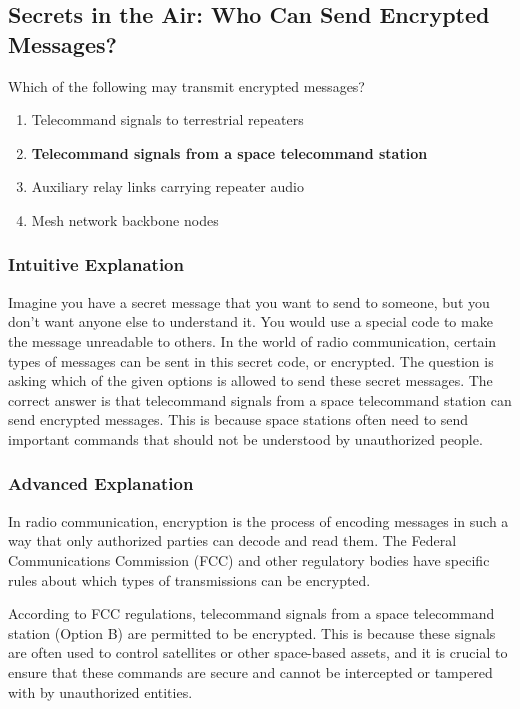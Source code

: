 \subsection{Secrets in the Air: Who Can Send Encrypted Messages?}

\begin{tcolorbox}[colback=gray!10!white,colframe=black!75!black,title=\textbf{E1D02}]
Which of the following may transmit encrypted messages?
\begin{enumerate}[label=\Alph*.]
    \item Telecommand signals to terrestrial repeaters
    \item \textbf{Telecommand signals from a space telecommand station}
    \item Auxiliary relay links carrying repeater audio
    \item Mesh network backbone nodes
\end{enumerate}
\end{tcolorbox}

\subsubsection{Intuitive Explanation}
Imagine you have a secret message that you want to send to someone, but you don't want anyone else to understand it. You would use a special code to make the message unreadable to others. In the world of radio communication, certain types of messages can be sent in this secret code, or encrypted. The question is asking which of the given options is allowed to send these secret messages. The correct answer is that telecommand signals from a space telecommand station can send encrypted messages. This is because space stations often need to send important commands that should not be understood by unauthorized people.

\subsubsection{Advanced Explanation}
In radio communication, encryption is the process of encoding messages in such a way that only authorized parties can decode and read them. The Federal Communications Commission (FCC) and other regulatory bodies have specific rules about which types of transmissions can be encrypted. 

According to FCC regulations, telecommand signals from a space telecommand station (Option B) are permitted to be encrypted. This is because these signals are often used to control satellites or other space-based assets, and it is crucial to ensure that these commands are secure and cannot be intercepted or tampered with by unauthorized entities.

